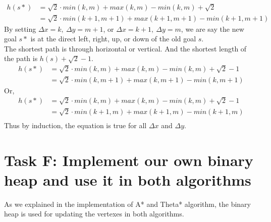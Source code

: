 \documentclass[12pt, letterpaper]{article}
\begin{document}
\begin{align*}
h(s*)&=\sqrt 2 \cdot min(k,m)+max(k,m)-min(k,m)+\sqrt 2\\
     &=\sqrt 2 \cdot min(k+1,m+1)+max(k+1,m+1)-min(k+1,m+1)
\end{align*}
By setting $\Delta x=k,\ \Delta y=m+1$, or $\Delta x=k+1,\ \Delta y=m$, we are say the new goal $s*$ is at the direct left, right, up, or down of the old goal $s$.\\
The shortest path is through horizontal or vertical. And the shortest length of the path is $h(s)+\sqrt 2-1$. \\
\begin{align*}
h(s*)&=\sqrt 2 \cdot min(k,m)+max(k,m)-min(k,m)+\sqrt 2-1\\
     &=\sqrt 2 \cdot min(k,m+1)+max(k,m+1)-min(k,m+1)
\end{align*}
Or,
\begin{align*}
h(s*)&=\sqrt 2 \cdot min(k,m)+max(k,m)-min(k,m)+\sqrt 2-1\\
     &=\sqrt 2 \cdot min(k+1,m)+max(k+1,m)-min(k+1,m)\\
\end{align*}
Thus by induction, the equation is true for all $\Delta x$ and $\Delta y$.\\

\section{Task F: Implement our own binary heap and use it in both algorithms}
As we explained in the implementation of A* and Theta* algorithm, the binary heap is used for updating the vertexes in both algorithms.
\end{document}
